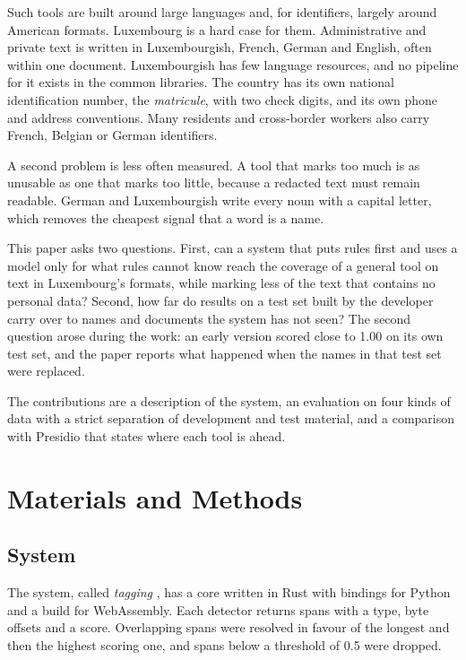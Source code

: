 \documentclass[10pt,a4paper,twocolumn]{article}
\begin{document}
Such tools are built around large languages and, for identifiers, largely around American
formats. Luxembourg is a hard case for them. Administrative and private text is written in
Luxembourgish, French, German and English, often within one document. Luxembourgish has few
language resources, and no pipeline for it exists in the common libraries. The country has its own
national identification number, the \emph{matricule}, with two check digits, and its own phone and
address conventions. Many residents and cross-border workers also carry French, Belgian or German
identifiers.

A second problem is less often measured. A tool that marks too much is as unusable as one that
marks too little, because a redacted text must remain readable. German and Luxembourgish write
every noun with a capital letter, which removes the cheapest signal that a word is a name.

This paper asks two questions. First, can a system that puts rules first and uses a model only for
what rules cannot know reach the coverage of a general tool on text in Luxembourg's formats, while
marking less of the text that contains no personal data? Second, how far do results on a test set
built by the developer carry over to names and documents the system has not seen? The second
question arose during the work: an early version scored close to 1.00 on its own test set, and the
paper reports what happened when the names in that test set were replaced.

The contributions are a description of the system, an evaluation on four kinds of data with a
strict separation of development and test material, and a comparison with Presidio that states
where each tool is ahead.

\section{Materials and Methods}

\subsection{System}

The system, called \emph{tagging} \citep{tagging}, has a core written in Rust with bindings for
Python and a build for WebAssembly. Each detector returns spans with a type, byte offsets and a
score. Overlapping spans were resolved in favour of the longest and then the highest scoring one,
and spans below a threshold of 0.5 were dropped.
\end{document}
